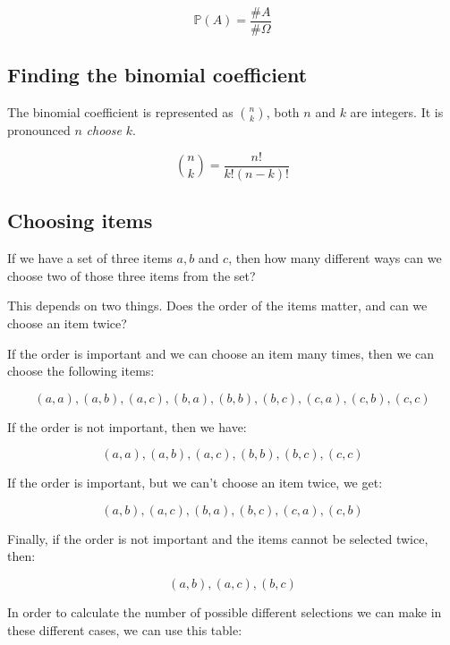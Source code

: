 \begin{dmath*}
	\mathbb{P}(A) = \frac{\#A}{\#\Omega}
\end{dmath*}

\subsection{Finding the binomial coefficient}

The binomial coefficient is represented as $n \choose k$, both $n$ and $k$ are
integers. It is pronounced $n$ {\it choose} $k$.

\begin{dmath*}
	{n \choose k} = \frac{n!}{k!(n-k)!}
\end{dmath*}

\subsection{Choosing items}

If we have a set of three items $a, b$ and $c$, then how many different ways can
we choose two of those three items from the set?

This depends on two things. Does the order of the items matter, and can we
choose an item twice?

If the order is important and we can choose an item many times, then we can
choose the following items:

\begin{dmath*}
	(a,a), (a,b), (a,c), (b,a), (b,b), (b,c), (c,a), (c,b), (c,c)
\end{dmath*}

If the order is not important, then we have:

\begin{dmath*}
	(a,a), (a,b), (a,c), (b,b), (b,c), (c,c)
\end{dmath*}

If the order is important, but we can't choose an item twice, we get:

\begin{dmath*}
	(a,b), (a,c), (b,a), (b,c), (c,a), (c,b)
\end{dmath*}

Finally, if the order is not important and the items cannot be selected twice,
then:

\begin{dmath*}
	(a,b), (a,c), (b,c)
\end{dmath*}

In order to calculate the number of possible different selections we can make in
these different cases, we can use this table:

